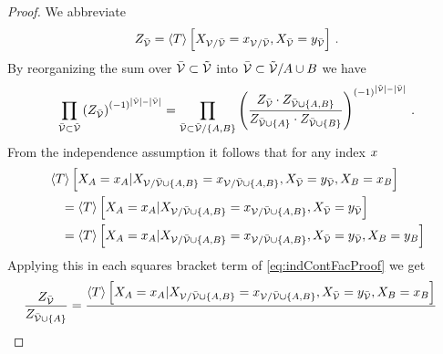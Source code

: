 \begin{proof}
    We abbreviate
    \[ Z_{\bar{\mathcal{V}}} = \left\langle T\right\rangle \left[ X_{\mathcal{V}/\bar{\mathcal{V}}}=x_{\mathcal{V}/\bar{\mathcal{V}}}, X_{\bar{\mathcal{V}}} = y_{\bar{\mathcal{V}}} \right] \, .
    \]
    By reorganizing the sum over $\bar{\mathcal{V}}\subset\tilde{\mathcal{V}}$ into  $\bar{\mathcal{V}}\subset\tilde{\mathcal{V}}/A\cup B$ we have
    \begin{align}
        \label{eq:indContFacProof}
        \prod_{\bar{\mathcal{V}}\subset\tilde{\mathcal{V}}}
        \left(
        Z_{\bar{\mathcal{V}}}
        \right)^{(-1)^{\left|\tilde{\mathcal{V}}\right|-\left|\bar{\mathcal{V}}\right|}} =
        \prod_{\bar{\mathcal{V}}\subset\tilde{\mathcal{V}}/\{A,B\}}
        \left(
        \frac{
            Z_{\bar{\mathcal{V}}} \cdot Z_{\bar{\mathcal{V}}\cup\{A,B\}}
        }{
            Z_{\bar{\mathcal{V}}\cup\{A\}} \cdot Z_{\bar{\mathcal{V}}\cup\{B\}}
        }
        \right)^{(-1)^{\left|\tilde{\mathcal{V}}\right|-\left|\bar{\mathcal{V}}\right|}} \, .
    \end{align}
    From the independence assumption it follows that for any index $x$
    \begin{align*}
        & \left\langle T\right\rangle \left[ 
            X_{A}=x_{A}
         | X_{\mathcal{V}/\bar{\mathcal{V}}\cup\{A,B\}}=x_{\mathcal{V}/\bar{\mathcal{V}}\cup\{A,B\}},X_{\bar{\mathcal{V}}}=y_{\bar{\mathcal{V}}},  X_{B}=x_{B}  \right]
        \\
        & \quad =
        \left\langle T\right\rangle \left[ 
            X_{A}=x_{A}
         | X_{\mathcal{V}/\bar{\mathcal{V}}\cup\{A,B\}}=x_{\mathcal{V}/\bar{\mathcal{V}}\cup\{A,B\}}, X_{\bar{\mathcal{V}}}=y_{\bar{\mathcal{V}}} \right] \\
        & \quad  =
        \left\langle T\right\rangle \left[ 
            X_{A}=x_{A}
         | X_{\mathcal{V}/\bar{\mathcal{V}}\cup\{A,B\}}=x_{\mathcal{V}/\bar{\mathcal{V}}\cup\{A,B\}},X_{\bar{\mathcal{V}}}=y_{\bar{\mathcal{V}}},  X_{B} = y_{B} \right]
    \end{align*}
    Applying this in each squares bracket term of \eqref{eq:indContFacProof} we get
    \begin{align*}
        \frac{
            Z_{\bar{\mathcal{V}}}
        }{
            Z_{\bar{\mathcal{V}}\cup\{A\}}
        }
        & =
        \frac{
            \left\langle T\right\rangle \left[ 
                X_{A}=x_{A}
             | X_{\mathcal{V}/\bar{\mathcal{V}}\cup\{A,B\}}=x_{\mathcal{V}/\bar{\mathcal{V}}\cup\{A,B\}}, X_{\bar{\mathcal{V}}}=y_{\bar{\mathcal{V}}}, X_{B}=x_{B}  \right]
        }{
}
\end{align*}
\end{proof}
